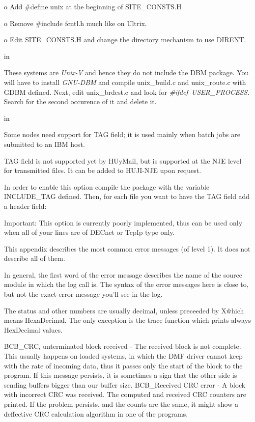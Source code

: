 {\ncrBold o} Add \#define unix  at the beginning of SITE\_CONSTS.H

{\ncrBold o} Remove \#include fcntl.h  much like on Ultrix.

{\ncrBold o}
Edit SITE\_CONSTS.H and change the directory mechanism to use DIRENT.

 in

These systems are {\it Unix-V} and hence they do not include the DBM package.
You will have to install {\it GNU-DBM} and compile {\ncrBold unix\_build.c}
and {\ncrBold unix\_route.c} with GDBM defined. Next, edit
{\ncrBold unix\_brdcst.c} and look for {\it \#ifdef~USER\_PROCESS}. Search for
the second occurence of it and delete it.

 in

Some nodes need support for TAG field; it is used mainly when batch jobs are
submitted to an IBM host.

TAG field is not supported yet by HUyMail, but is supported at the NJE level
for transmitted files. It can be added to HUJI-NJE upon request.

In order to enable this option compile the package with the variable
INCLUDE\_TAG defined. Then, for each file you want to have the TAG field add
a header field:


{\ncrBold Important:} This option is currently poorly implemented, thus can
be used only when all of your lines are of DECnet or TcpIp type only.

\vfill\eject


This appendix describes the most common error messages (of level  1).
It does not describe all of them.

In general, the first word of the error message describes the name of
the source module in which the log call is.
The syntax of the error messages here is close to, but not the  exact
error message you'll see in the log.

The status and other numbers are usually decimal, unless preceeded by
X\^ which means HexaDecimal. The only exception  is  the  trace  function
which prints always HexDecimal values.

\hfill\break
{\ncrBold BCB\_CRC,  unterminated  block  received}
-  The  received  block  is not
complete. This usually happens on  loaded  systems,  in  which  the  DMF
driver  cannot  keep with the rate of incoming data, thus it passes only
the start of the block to the program. If this message persists,  it  is
sometimes  a sign that the other side is sending buffers bigger than our
buffer size.
\hfill\break
{\ncrBold BCB\_Received CRC error -}
A block with incorrect CRC  was  received.
The  computed  and  received  CRC  counters  are printed. If the problem
persists, and the counts are the same, it might show  a  deffective  CRC
calculation algorithm in one of the programs.

